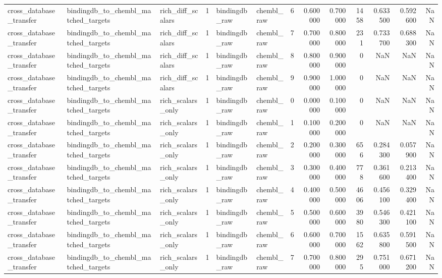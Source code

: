 \begin{longtable}{lllrllrrrrrrr}
cross\_database\_transfer & bindingdb\_to\_chembl\_matched\_targets & rich\_diff\_scalars & 1 & bindingdb\_raw & chembl\_raw & 6 & 0.600000 & 0.700000 & 1458 & 0.633500 & 0.592600 & NaN \\
cross\_database\_transfer & bindingdb\_to\_chembl\_matched\_targets & rich\_diff\_scalars & 1 & bindingdb\_raw & chembl\_raw & 7 & 0.700000 & 0.800000 & 231 & 0.733700 & 0.688300 & NaN \\
cross\_database\_transfer & bindingdb\_to\_chembl\_matched\_targets & rich\_diff\_scalars & 1 & bindingdb\_raw & chembl\_raw & 8 & 0.800000 & 0.900000 & 0 & NaN & NaN & NaN \\
cross\_database\_transfer & bindingdb\_to\_chembl\_matched\_targets & rich\_diff\_scalars & 1 & bindingdb\_raw & chembl\_raw & 9 & 0.900000 & 1.000000 & 0 & NaN & NaN & NaN \\
cross\_database\_transfer & bindingdb\_to\_chembl\_matched\_targets & rich\_scalars\_only & 1 & bindingdb\_raw & chembl\_raw & 0 & 0.000000 & 0.100000 & 0 & NaN & NaN & NaN \\
cross\_database\_transfer & bindingdb\_to\_chembl\_matched\_targets & rich\_scalars\_only & 1 & bindingdb\_raw & chembl\_raw & 1 & 0.100000 & 0.200000 & 0 & NaN & NaN & NaN \\
cross\_database\_transfer & bindingdb\_to\_chembl\_matched\_targets & rich\_scalars\_only & 1 & bindingdb\_raw & chembl\_raw & 2 & 0.200000 & 0.300000 & 656 & 0.284300 & 0.057900 & NaN \\
cross\_database\_transfer & bindingdb\_to\_chembl\_matched\_targets & rich\_scalars\_only & 1 & bindingdb\_raw & chembl\_raw & 3 & 0.300000 & 0.400000 & 778 & 0.361600 & 0.213400 & NaN \\
cross\_database\_transfer & bindingdb\_to\_chembl\_matched\_targets & rich\_scalars\_only & 1 & bindingdb\_raw & chembl\_raw & 4 & 0.400000 & 0.500000 & 4606 & 0.456100 & 0.329400 & NaN \\
cross\_database\_transfer & bindingdb\_to\_chembl\_matched\_targets & rich\_scalars\_only & 1 & bindingdb\_raw & chembl\_raw & 5 & 0.500000 & 0.600000 & 3980 & 0.546300 & 0.421100 & NaN \\
cross\_database\_transfer & bindingdb\_to\_chembl\_matched\_targets & rich\_scalars\_only & 1 & bindingdb\_raw & chembl\_raw & 6 & 0.600000 & 0.700000 & 1562 & 0.635800 & 0.591500 & NaN \\
cross\_database\_transfer & bindingdb\_to\_chembl\_matched\_targets & rich\_scalars\_only & 1 & bindingdb\_raw & chembl\_raw & 7 & 0.700000 & 0.800000 & 295 & 0.751000 & 0.671200 & NaN \\

\end{longtable}
